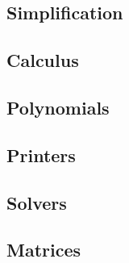 \subsection{Simplification}



\subsection{Calculus}
\label{sec:calculus}


\subsection{Polynomials}


\subsection{Printers}



\subsection{Solvers}


\subsection{Matrices}


